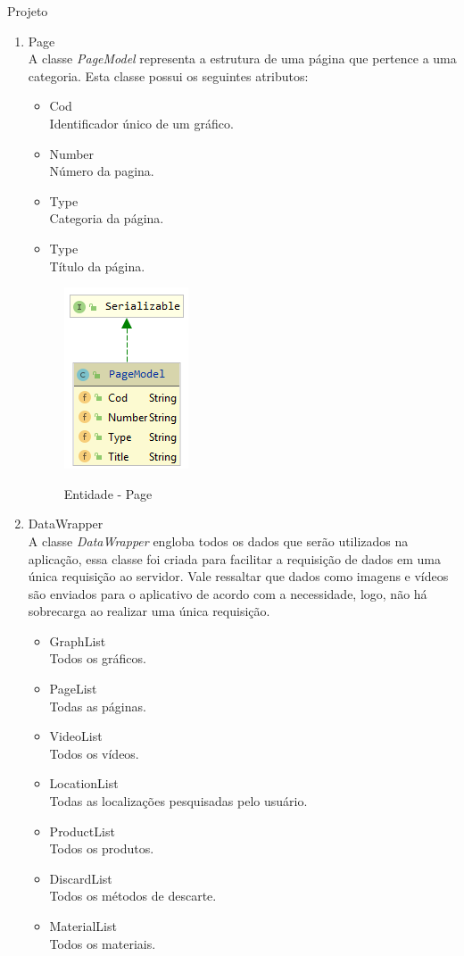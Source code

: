 \documentclass[
	12pt,				%
	openright,			%
	twoside,			%
	a4paper,			%
	english,			%
	french,				%
	spanish,			%
	brazil				%
	]{abntex2}
\begin{document}
\begin{chapter}{Projeto}
\begin{enumerate}
  \item{Page}   \\ A classe \textit{PageModel} representa a estrutura de uma página que pertence a uma categoria. Esta classe possui os seguintes atributos:
  \begin{itemize}
  \item{Cod}\\ Identificador único de um gráfico.
       \item{Number}\\Número da pagina.
         \item{Type}\\ Categoria da página.
          \item{Type}\\ Título da página.
\end{itemize}
\begin{figure}[h]
\centering
   \caption{Entidade - Page}
   \includegraphics[scale=1.0]{media/PageModel.png}
     \label{fig:pageModel}
\end{figure}

\newpage
\item{DataWrapper}   \\ A classe \textit{DataWrapper} engloba todos os dados que serão utilizados na aplicação, essa classe foi criada para facilitar a requisição de dados em uma única requisição ao servidor. Vale ressaltar que dados como imagens e vídeos são enviados para o aplicativo de acordo com a necessidade, logo, não há sobrecarga ao realizar uma única requisição.
\newline
  \begin{itemize}
  \item{GraphList}\\ Todos os gráficos.
       \item{PageList}\\  Todas as páginas.
         \item{VideoList}\\ Todos os vídeos.
         \item{LocationList}\\ Todas as localizações pesquisadas pelo usuário.
         \item{ProductList}\\  Todos os produtos.
         \item{DiscardList}\\ Todos os métodos de descarte.
         \item{MaterialList}\\  Todos os materiais.
         

\end{itemize}
\end{enumerate}
\end{chapter}
\end{document}
